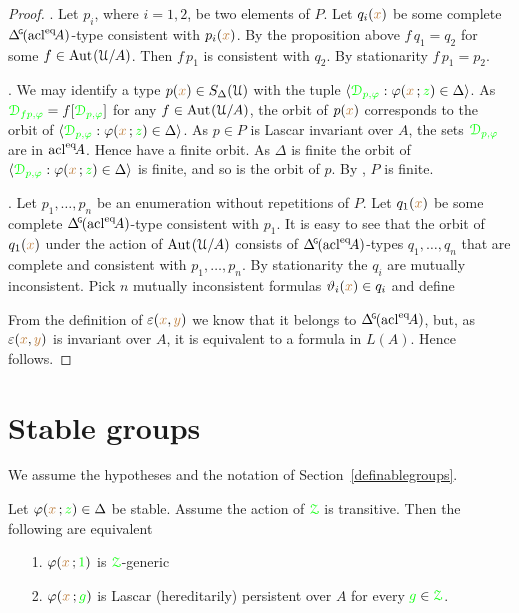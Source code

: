 \begin{proof}
  .
  Let $p_i$, where $i=1,2$, be two elements of $P$.
  Let $q_i({\color{brown} x})$ be some complete $\GDelta(\acl^\eq\!A)$-type consistent with $p_i({\color{brown} x})$.
  By the proposition above $f\,q_1=q_2$ for some $f\in{\rm Aut\kern.15ex}(\EuScript U/A)$.
  Then $f\,p_1$ is consistent with $q_2$.
  By stationarity $f\,p_1=p_2$.

  .
  We may identify a type $p({\color{brown} x})\in S_\Delta(\EuScript U)$ with the tuple $\langle{\color{green}\EuScript D_{p,\varphi}}:\varphi({\color{brown} x}\,;{\color{green} z})\in\Delta\rangle$.
  As ${\color{green}\EuScript D_{fp,\varphi}}=f[{\color{green}\EuScript D_{p,\varphi}}]$ for any $f\in{\rm Aut\kern.15ex}(\EuScript U/A)$, the orbit of $p({\color{brown} x})$ corresponds to the orbit of $\langle{\color{green}\EuScript D_{p,\varphi}}:\varphi({\color{brown} x}\,;{\color{green} z})\in\Delta\rangle$.
  As $p\in P$ is Lascar invariant over $A$, the sets ${\color{green}\EuScript D_{p,\varphi}}$ are in ${\rm acl}^{{\rm eq}}\!A$.
  Hence have a finite orbit.
  As $\Delta$ is finite the orbit of $\langle{\color{green}\EuScript D_{p,\varphi}}:\varphi({\color{brown} x}\,;{\color{green} z})\in\Delta\rangle$ is finite, and so is the orbit of $p$.
  By , $P$ is finite.

  . 
  Let $p_1,\dots,p_n$ be an enumeration without repetitions of $P$.
  Let $q_1({\color{brown} x})$ be some complete $\GDelta(\acl^\eq\!A)$-type consistent with $p_1$.
  It is easy to see that the orbit of $q_1({\color{brown} x})$ under the action of ${\rm Aut\kern.15ex}(\EuScript U/A)$ consists of $\GDelta(\acl^\eq\!A)$-types $q_1,\dots,q_n$ that are complete and consistent with $p_1,\dots,p_n$.
  By stationarity the $q_i$ are mutually inconsistent.
  Pick $n$ mutually inconsistent formulas $\vartheta_i({\color{brown} x})\in q_i$ and define

  
  From the definition of $\varepsilon({\color{brown} x},{\color{brown} y})$ we know that it belongs to $\GDelta(\acl^\eq\!A)$, but, as $\varepsilon({\color{brown} x},{\color{brown} y})$ is invariant over $A$, it is equivalent to a formula in $L(A)$.
  Hence  follows.
\end{proof}

\section{Stable groups}\label{stable_groups}

We assume the hypotheses and the notation of Section~\ref{definablegroups}.

\begin{theorem}\label{thm_Ggeneric_persistent}
  Let $\varphi({\color{brown} x}\,;{\color{green} z})\in\Delta$ be stable.
  Assume the action of ${\color{green}\EuScript Z}$ is transitive.
  Then the following are equivalent
  \begin{itemize}
    \item [1.] $\varphi({\color{brown} x}\,;{\color{green} 1})$ is ${\color{green}\EuScript Z}$-generic
    \item [2.] $\varphi({\color{brown} x}\,;{\color{green} g})$ is Lascar (hereditarily) persistent over $A$ for every ${\color{green} g}\in{\color{green}\EuScript Z}$.
  \end{itemize}
\end{theorem}

